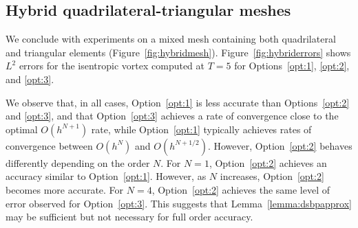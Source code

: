 \documentclass{svjour3}                     %
\begin{document}


\subsection{Hybrid quadrilateral-triangular meshes}

We conclude with experiments on a mixed mesh containing both quadrilateral and triangular elements (Figure~\ref{fig:hybridmesh}).  Figure~\ref{fig:hybriderrors} shows $L^2$ errors for the isentropic vortex computed at $T = 5$ for Options~\ref{opt:1}, \ref{opt:2}, and \ref{opt:3}.  

We observe that, in all cases, Option~\ref{opt:1} is less accurate than Options~\ref{opt:2} and \ref{opt:3}, and that Option~\ref{opt:3} achieves a rate of convergence close to the optimal $O(h^{N+1})$ rate, while Option~\ref{opt:1} typically achieves rates of convergence between $O(h^N)$ and $O(h^{N+1/2})$.  However, Option~\ref{opt:2} behaves differently depending on the order $N$.  For $N = 1$, Option~\ref{opt:2} achieves an accuracy similar to Option~\ref{opt:1}.  However, as $N$ increases, Option~\ref{opt:2} becomes more accurate.  For $N=4$, Option~\ref{opt:2} achieves the same level of error observed for Option~\ref{opt:3}.  This suggests that Lemma~\ref{lemma:dsbpapprox} may be sufficient but not necessary for full order accuracy.

\end{document}
